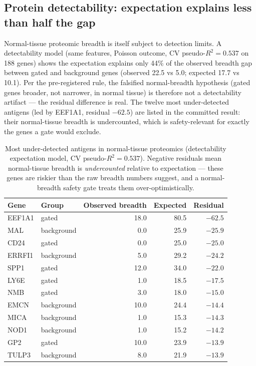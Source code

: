 \documentclass[11pt]{article}
\begin{document}
\subsection{Protein detectability: expectation explains less than half the gap}
Normal-tissue proteomic breadth is itself subject to detection limits. A
detectability model (same features, Poisson outcome, CV pseudo-$R^2=0.537$ on
188 genes) shows the expectation explains only 44\% of the observed
breadth gap between gated and background genes (observed 22.5 vs 5.0;
expected 17.7 vs 10.1). Per the pre-registered rule, the falsified
normal-breadth hypothesis (gated genes broader, not narrower, in normal
tissue) is therefore not a detectability artifact --- the residual difference
is real. The twelve most under-detected antigens (led by EEF1A1, residual
$-62.5$) are listed in the committed result: their normal-tissue breadth is
undercounted, which is safety-relevant for exactly the genes a gate would
exclude.

\begin{table}[t]\centering\footnotesize
\caption{Most under-detected antigens in normal-tissue proteomics
(detectability expectation model, CV pseudo-$R^2=0.537$). Negative residuals
mean normal-tissue breadth is \emph{undercounted} relative to expectation ---
these genes are riskier than the raw breadth numbers suggest, and a
normal-breadth safety gate treats them over-optimistically.}\label{tab:underdetected}
\begin{tabular}{llrrr}
\toprule
Gene & Group & Observed breadth & Expected & Residual \\
\midrule
EEF1A1 & gated & 18.0 & 80.5 & $-62.5$ \\
MAL & background & 0.0 & 25.9 & $-25.9$ \\
CD24 & gated & 0.0 & 25.0 & $-25.0$ \\
ERRFI1 & background & 5.0 & 29.2 & $-24.2$ \\
SPP1 & gated & 12.0 & 34.0 & $-22.0$ \\
LY6E & gated & 1.0 & 18.5 & $-17.5$ \\
NMB & gated & 3.0 & 18.0 & $-15.0$ \\
EMCN & background & 10.0 & 24.4 & $-14.4$ \\
MICA & background & 1.0 & 15.3 & $-14.3$ \\
NOD1 & background & 1.0 & 15.2 & $-14.2$ \\
GP2 & gated & 10.0 & 23.9 & $-13.9$ \\
TULP3 & background & 8.0 & 21.9 & $-13.9$ \\
\bottomrule
\end{tabular}
\end{table}
\end{document}
